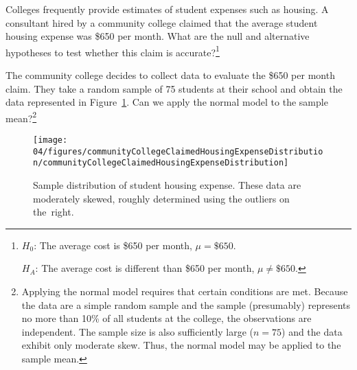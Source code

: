 \begin{exercise} \label{htForHousingExpenseForCommunityCollege650}
Colleges frequently provide estimates of student expenses such as housing. A consultant hired by a community college claimed that the average student housing expense was \$650 per month. What are the null and alternative hypotheses to test whether this claim is accurate?\footnote{$H_0$: The average cost is \$650 per month, $\mu = \$650$.

\hspace{3.4mm}$H_A$: The average cost is different than \$650 per month, $\mu \neq \$650$.}
\end{exercise}

\begin{exercise} \label{normalDistCondForHousingExpenseForCommunityCollege650}
The community college decides to collect data to evaluate the \$650 per month claim. They take a random sample of 75 students at their school and obtain the data represented in Figure~\ref{communityCollegeClaimedHousingExpenseDistribution}. Can we apply the normal model to the sample mean?\footnote{Applying the normal model requires that certain conditions are met. Because the data are a simple random sample and the sample (presumably) represents no more than 10\% of all students at the college, the observations are independent. The sample size is also sufficiently large ($n=75$) and the data exhibit only moderate skew. Thus, the normal model may be applied to the sample mean.}

\begin{figure}
\centering
\texttt{[image: 04/figures/communityCollegeClaimedHousingExpenseDistribution/communityCollegeClaimedHousingExpenseDistribution]}
\caption{Sample distribution of student housing expense. These data are moderately skewed, roughly determined using the outliers on the~right.}
\label{communityCollegeClaimedHousingExpenseDistribution}
\end{figure}
\end{exercise}



